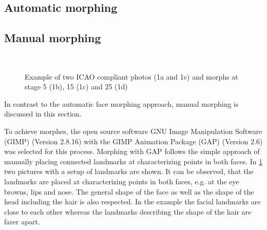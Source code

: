\subsection{Automatic morphing}
\label{automatic_morph}


\subsection{Manual morphing}
\label{manual_morph}
\begin{figure}[h]
	\centering
	\label{subfig:manualmorph01}\hfill
	\label{subfig:manualmorph02}\\
	\caption{Example of two ICAO compliant photos (1a and 1e) and morphs at stage 5 (1b), 15 (1c) and 25 (1d)}
	\label{fig:manual_morph} 
\end{figure}
In contrast to the automatic face morphing approach, manual morphing is discussed in this section. 

To achieve morphes, the open source software GNU Image Manipulation Software (GIMP) (Version 2.8.16) with the GIMP Animation Package (GAP) (Version 2.6) was selected for this process. Morphing with GAP follows the simple approach of manually placing connected landmarks at characterizing points in both faces. In \ref{fig:manual_morph} two pictures with a setup of landmarks are shown. It can be observed, that the landmarks are placed at characterizing points in both faces, e.g. at the eye browns, lips and nose. The general shape of the face as well as the shape of the head including the hair is also respected. In the example the facial landmarks are close to each other whereas the landmarks describing the shape of the hair are farer apart. 

